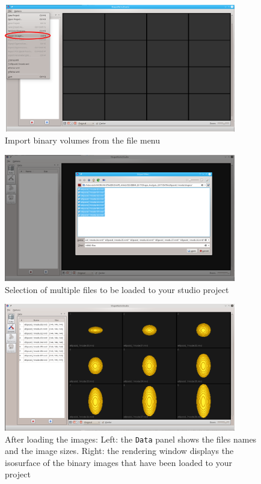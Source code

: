 \documentclass[letterpaper,12pt]{article}   %
\begin{document}
\begin{figure}[!htp]
	\centering
	\includegraphics[width=0.9\textwidth]{figs_v2/import.png}
	\caption{Import binary volumes from the file menu}
	\label{fig:import}
\end{figure}

\begin{figure}[!htp]
	\centering
	\includegraphics[width=0.9\textwidth]{figs_v2/imagefiles.png}
	\caption{Selection of multiple files to be loaded to your studio project}
	\label{fig:imagefiles}
\end{figure}

\begin{figure}[!htp]
	\centering
	\includegraphics[width=0.9\textwidth]{figs_v2/ellipsoid_images.png}
	\caption{After loading the images: Left: the \texttt{Data} panel shows the files names and the image sizes. Right: the rendering window displays the isosurface of the binary images that have been loaded to your project}
	\label{fig:ellipsoid_images}
\end{figure}
\end{document}
